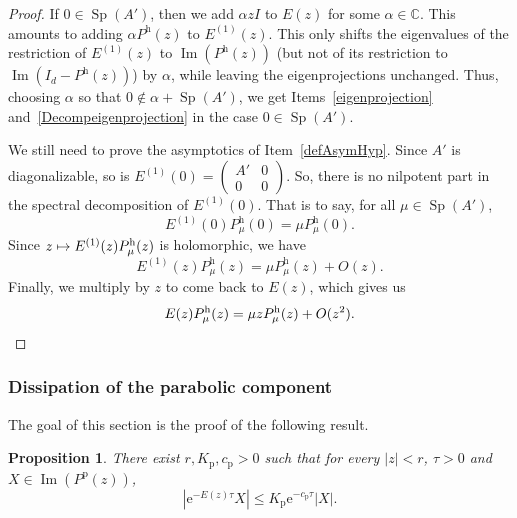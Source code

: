\documentclass[10pt]{amsart}
\def\mto{\mathchoice{\longmapsto}{\mapsto}{\mapsto}{\mapsto}}
\theoremstyle{plain}
\newtheorem{prop}[theorem]{Proposition}
\theoremstyle{definition}
\theoremstyle{remark}
\DeclareMathOperator{\Sp}{Sp}
\DeclareMathOperator{\Ima}{Im}
\let\bigO O
\newcommand{\set}{\mathbb}
\newcommand{\h}{{\mathrm h}}
\newcommand{\p}{{\mathrm p}}
\newcommand{\eu}{\mathrm e}
\begin{document}
\begin{proof}
If $0\in\Sp(A')$, then we add $\alpha zI$ to $E(z)$ for some $\alpha\in\set C$. This amounts to adding $\alpha P^\h(z)$ to $E^{(1)}(z)$. This only shifts the eigenvalues of the restriction of $E^{(1)}(z)$ to $\Ima(P^\h(z))$ (but not of its restriction to $\Ima(I_d-P^\h(z))$) by $\alpha$, while leaving the eigenprojections unchanged. Thus, choosing $\alpha$ so that $0\notin \alpha+\Sp(A')$, we get Items~\eqref{eigenprojection} and~\eqref{Decompeigenprojection} in the case $0\in\Sp(A')$.

We still need to prove the asymptotics of Item~\eqref{defAsymHyp}. Since $A'$ is diagonalizable, so is $E^{(1)}(0) = (\begin{smallmatrix} A'&0\\0&0 \end{smallmatrix})$. So, there is no nilpotent part in the spectral decomposition of $E^{(1)}(0)$. That is to say, for all $\mu\in\Sp(A')$,
\[
E^{(1)}(0)P_\mu^\h(0) = \mu P_\mu^\h(0).
\]
Since $z\mto E^{(1)}(z)P_\mu^\h(z)$ is holomorphic, we have
\[
E^{(1)}(z)P_\mu^\h(z) = \mu P_\mu^\h(z)+\bigO(z).
\]
Finally, we multiply by $z$ to come back to $E(z)$, which gives us
\[
E(z)P_\mu^\h(z) = \mu zP_\mu^\h(z)+\bigO(z^2).\qedhere
\]
\end{proof}

\label{subsubsec:EF_WP}

\subsubsection{Dissipation of the parabolic component}\label{subsubsec:dissipation}

The goal of this section is the proof of the following result.

\begin{prop} \label{Prop:dissip_p}
There exist $r, K_\p, c_\p >0$ such that for every $|z|<r$, $\tau >0$ and $X\in\Ima(P^\p(z))$,
\[
|\eu^{- E(z) \tau} X | \leq K_\p \eu^{-c_\p \tau} |X|.
\]
\end{prop}
\end{document}
